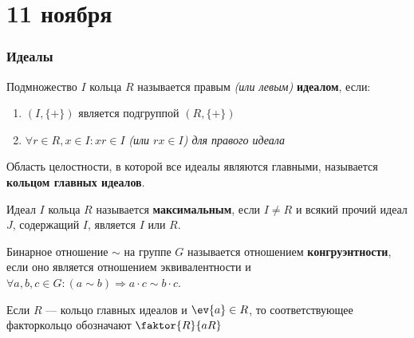 \chapter{11 ноября}

\subsection{Идеалы}

\begin{definition}
    Подмножество \(I\) кольца \(R\) называется правым \textit{(или левым)}
    \textbf{идеалом}, если:
    \begin{enumerate}
        \item \((I, \{+\})\) является подгруппой \((R, \{+\})\)
        \item \(\forall r \in R, x \in I : xr \in I\)
        \textit{(или \(rx \in I\)) для правого идеала}
    \end{enumerate}
\end{definition}

\unfinished

\begin{definition}
	Область целостности, в которой все идеалы являются главными,
    называется \textbf{кольцом главных идеалов}.
\end{definition}

\begin{definition}
    Идеал \(I\) кольца \(R\) называется \textbf{максимальным}, если
    \(I \neq R\) и всякий прочий идеал \(J\), содержащий \(I\), является \(I\) или \(R\).
\end{definition}

\unfinished

\begin{definition}
    Бинарное отношение \(\sim\) на группе \(G\) называется отношением
    \textbf{конгруэнтности}, если оно является отношением эквивалентности
    и \(\forall a,b,c \in G : (a \sim b) \Rightarrow a \cdot c \sim b \cdot c\).
\end{definition}

\unfinished

Если \(R\) --- кольцо главных идеалов и \(\ev{a} \in R\),
то соответствующее факторкольцо обозначают \(\faktor{R}{aR}\)


